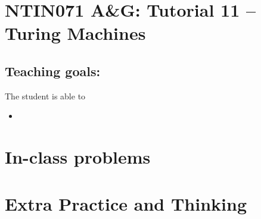\documentclass[a4paper,12pt]{amsart}
\begin{document}
\thispagestyle{empty}

\section*{NTIN071 A\&G: Tutorial 11 -- Turing Machines}

\medskip

\subsection*{Teaching goals:} The student is able to

    \begin{itemize}\setlength{\itemsep}{0pt}
        \item 
    \end{itemize}


\section*{In-class problems}


\medskip\begin{problem}

\end{problem}


\section*{Extra Practice and Thinking}


\medskip\begin{problem}

\end{problem}
\end{document}

